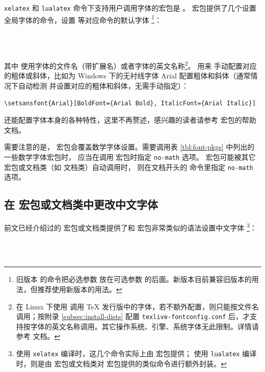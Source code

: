 \texttt{xelatex} 和 \texttt{lualatex} 命令下支持用户调用字体的宏包是 。
宏包提供了几个设置全局字体的命令，设置  等对应命令的默认字体%
\footnote{旧版本  的命令把必选参数  放在可选参数  的后面。新版本目前兼容旧版本的用法，但推荐使用新版本的用法。}：
\begin{command}
 \\
 \\
\end{command}
其中  使用字体的文件名（带扩展名）或者字体的英文名称\footnote{
	在 Linux 下使用  调用 \TeX{} 发行版中的字体，若不额外配置，则只能按文件名调用；按附录 \ref{subsec:install-dists} 配置 \texttt{texlive-fontconfig.conf} 后，才支持按字体的英文名称调用。其它操作系统、引擎、系统字体无此限制。详情请参考  文档。
}。 用来
手动配置对应的粗体或斜体，比如为 Windows 下的无衬线字体 Arial 配置粗体和斜体（通常情况下自动检测
并设置对应的粗体和斜体，无需手动指定）：
\begin{verbatim}
\setsansfont{Arial}[BoldFont={Arial Bold}, ItalicFont={Arial Italic}]
\end{verbatim}
 还能配置字体本身的各种特性，这里不再赘述，感兴趣的读者请参考  宏包的帮助文档。

需要注意的是， 宏包会覆盖数学字体设置。需要调用表 \ref{tbl:font-pkgs} 中列出的一些数学字体宏包时，
应当在调用  宏包时指定 \texttt{no-math} 选项。 宏包可能被其它宏包或文档类（如  文档类）自动调用时，
则在文档开头的  命令里指定 \texttt{no-math} 选项。

\subsection{在  宏包或文档类中更改中文字体}\label{subsec:CJKfont}

前文已经介绍过的  宏包或文档类提供了和  宏包非常类似的语法设置中文字体%
\footnote{使用 \texttt{xelatex} 编译时，这几个命令实际上由  宏包提供；
使用 \texttt{lualatex} 编译时，则是由  宏包或文档类对  宏包提供的类似命令进行额外封装。}：
\begin{command}
 \\
 \\
\end{command}

